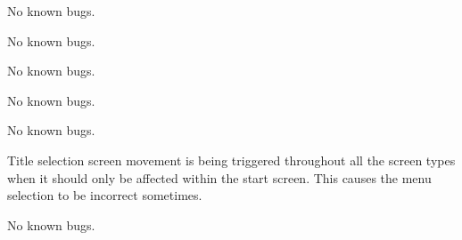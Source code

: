 
\begin{DoxyRefList}
\item[File \mbox{\hyperlink{_bullet_8h}{Bullet.h}} ]\label{bug__bug000001}%
%
No known bugs.  
\item[File \mbox{\hyperlink{_controls_8h}{Controls.h}} ]\label{bug__bug000002}%
%
No known bugs.  
\item[File \mbox{\hyperlink{_play_b_g_8h}{Play\+BG.h}} ]\label{bug__bug000004}%
%
No known bugs.  
\item[File \mbox{\hyperlink{_player_8h}{Player.h}} ]\label{bug__bug000005}%
%
No known bugs.  
\item[File \mbox{\hyperlink{_play_screen_8h}{Play\+Screen.h}} ]\label{bug__bug000006}%
%
No known bugs.  
\item[File \mbox{\hyperlink{_screen_manager_8h}{Screen\+Manager.h}} ]\label{bug__bug000007}%
%
Title selection screen movement is being triggered throughout all the screen types when it should only be affected within the start screen. This causes the menu selection to be incorrect sometimes.  
\item[File \mbox{\hyperlink{_start_screen_8h}{Start\+Screen.h}} ]\label{bug__bug000008}%
%
No known bugs. 
\end{DoxyRefList}